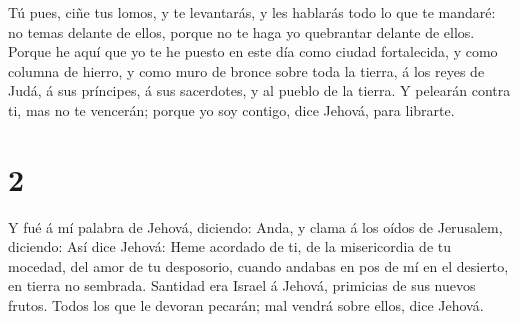  Tú pues, ciñe tus lomos, y te levantarás, y les hablarás
todo lo que te mandaré: no temas delante de ellos, porque no te haga yo
quebrantar delante de ellos.  Porque he aquí que yo te he
puesto en este día como ciudad fortalecida, y como columna de hierro, y
como muro de bronce sobre toda la tierra, á los reyes de Judá, á sus
príncipes, á sus sacerdotes, y al pueblo de la tierra.  Y
pelearán contra ti, mas no te vencerán; porque yo soy contigo, dice
Jehová, para librarte.

\hypertarget{section-1}{%
\section{2}\label{section-1}}

 Y fué á mí palabra de Jehová, diciendo:  Anda,
y clama á los oídos de Jerusalem, diciendo: Así dice Jehová: Heme
acordado de ti, de la misericordia de tu mocedad, del amor de tu
desposorio, cuando andabas en pos de mí en el desierto, en tierra no
sembrada.  Santidad era Israel á Jehová, primicias de sus
nuevos frutos. Todos los que le devoran pecarán; mal vendrá sobre ellos,
dice Jehová.

